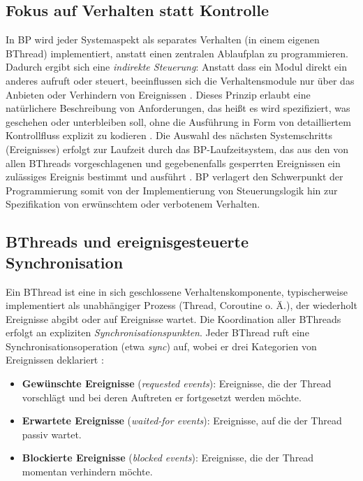 \subsection{Fokus auf Verhalten statt Kontrolle}\label{subsec:fokus-auf-verhalten-statt-kontrolle}
In BP wird jeder Systemaspekt als separates Verhalten (in einem eigenen BThread) implementiert, anstatt einen zentralen Ablaufplan zu programmieren.
Dadurch ergibt sich eine \emph{indirekte Steuerung}: Anstatt dass ein Modul direkt ein anderes aufruft oder steuert, beeinflussen sich die Verhaltensmodule nur über das Anbieten oder Verhindern von Ereignissen \cite{Harel2012}.
Dieses Prinzip erlaubt eine natürlichere Beschreibung von Anforderungen, das heißt es wird spezifiziert, was geschehen oder unterbleiben soll, ohne die Ausführung in Form von detailliertem Kontrollfluss explizit zu kodieren \cite{Harel2012}.
Die Auswahl des nächsten Systemschritts (Ereignisses) erfolgt zur Laufzeit durch das BP-Laufzeitsystem, das aus den von allen BThreads vorgeschlagenen und gegebenenfalls gesperrten Ereignissen ein zulässiges Ereignis bestimmt und ausführt \cite{Harel2012}.
BP verlagert den Schwerpunkt der Programmierung somit von der Implementierung von Steuerungslogik hin zur Spezifikation von erwünschtem oder verbotenem Verhalten.

\subsection{BThreads und ereignisgesteuerte Synchronisation}\label{subsec:b-threads-und-ereignisgesteuerte-synchronisation}
Ein BThread ist eine in sich geschlossene Verhaltenskomponente, typischerweise implementiert als unabhängiger Prozess (Thread, Coroutine o. Ä.), der wiederholt Ereignisse abgibt oder auf Ereignisse wartet.
Die Koordination aller BThreads erfolgt an expliziten \emph{Synchronisationspunkten}.
Jeder BThread ruft eine Synchronisationsoperation (etwa \emph{sync}) auf, wobei er drei Kategorien von Ereignissen deklariert \cite{Harel2010}:
\begin{itemize}
  \item \textbf{Gewünschte Ereignisse} (\emph{requested events}): Ereignisse, die der Thread vorschlägt und bei deren Auftreten er fortgesetzt werden möchte.
  \item \textbf{Erwartete Ereignisse} (\emph{waited-for events}): Ereignisse, auf die der Thread passiv wartet.
  \item \textbf{Blockierte Ereignisse} (\emph{blocked events}): Ereignisse, die der Thread momentan verhindern möchte.
\end{itemize}

